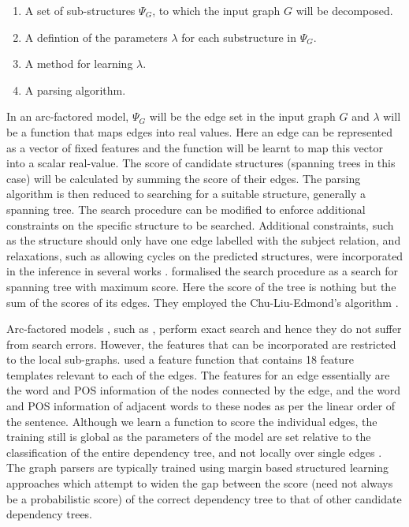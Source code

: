\documentclass[11pt]{article}
\begin{document}
\begin{enumerate}
    \item A set of sub-structures $\Psi_G$, to which the input graph $G$ will be decomposed.
    \item A defintion of the parameters $\lambda$ for each substructure in $\Psi_G$.
    \item A method for learning $\lambda$.
    \item A parsing algorithm.
\end{enumerate}


In an arc-factored model,  $\Psi_G$ will be the edge set in the input graph $G$ and  $\lambda$ will be a function that maps edges into real values. Here an edge can be represented as a vector of fixed features and the function will be learnt to map this vector into a scalar real-value. The score of candidate structures (spanning trees in this case) will be calculated by summing the score of their edges. The parsing algorithm is then reduced to searching for a suitable structure, generally a spanning tree.  The search procedure can be modified to enforce additional constraints on the specific structure to be searched. Additional constraints, such as the structure should only have one edge labelled with the subject relation, and relaxations, such as allowing cycles on the predicted structures, were incorporated in the inference in several works \cite{kubler2009dependency}.  formalised the search procedure as a search for  spanning tree with maximum score. Here the score of the tree is nothing but the sum of the scores of its edges. They employed the Chu-Liu-Edmond's algorithm \cite{edmonds1967optimum}. 


Arc-factored models , such as , perform exact search and hence they do not suffer from search errors. However, the features that can be incorporated are  restricted to the local sub-graphs.  used a feature function that contains 18 feature templates relevant to each of the edges. The features for an edge essentially are the word and POS information of the nodes connected by the edge, and the word and POS information of adjacent words to these nodes as per the linear order of the sentence. Although we learn a function to score the individual edges, the training still is global as the parameters of the model are set relative to the classification of the entire dependency tree, and not locally over single edges \cite{mcdonald-nivre-2011-analyzing}. The graph parsers are typically trained using margin based structured learning approaches which attempt to widen the gap between the score (need not always be a probabilistic score) of the correct dependency tree to that of other candidate dependency trees. 
\end{document}
